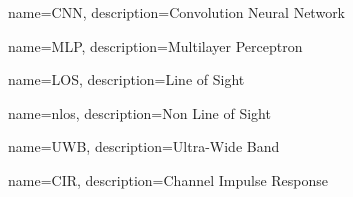 {
    name=CNN,
    description={Convolution Neural Network}
}

{
    name=MLP,
    description={Multilayer Perceptron}
}

{
    name=LOS,
    description={Line of Sight}
}

{
    name=nlos,
    description={Non Line of Sight}
}

{
    name=UWB,
    description={Ultra-Wide Band}
}

{
    name=CIR,
    description={Channel Impulse Response}
}